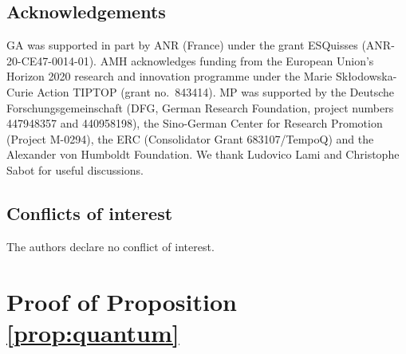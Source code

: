 \documentclass{amsart}
\newcommand{\gC}{\mathsf{C}}
\theoremstyle{plain}
\newcommand{\out}[1]{\textcolor{red}{#1}}
\begin{document}

\subsection*{Acknowledgements} GA was supported in part by ANR (France) under the grant ESQuisses (ANR-20-CE47-0014-01). AMH acknowledges funding from the European Union's Horizon 2020 research and innovation programme under the Marie Sk\l odowska-Curie Action TIPTOP (grant no.\ 843414). MP was supported by the Deutsche Forschungsgemeinschaft (DFG, German Research Foundation, project numbers 447948357 and 440958198), the Sino-German Center for Research Promotion (Project M-0294), the ERC (Consolidator Grant 683107/TempoQ) and the Alexander von Humboldt Foundation. We thank Ludovico Lami and Christophe Sabot for useful discussions.

\subsection*{Conflicts of interest} The authors declare no conflict of interest.

\appendix \label{app:quantum}

\section{Proof of Proposition \ref{prop:quantum}}
\end{document}
